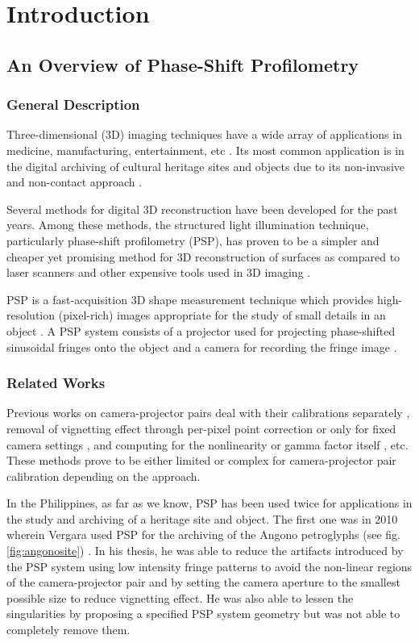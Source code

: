 \chapter{Introduction}
\section{An Overview of Phase-Shift Profilometry}
\subsection{General Description}

Three-dimensional (3D) imaging techniques have a wide array of applications in medicine, manufacturing, entertainment, etc \cite{Guo2009}. 
Its most common application is in the digital archiving of cultural heritage sites and objects due to its non-invasive and non-contact approach \cite{Simon2013}. 

Several methods for digital 3D reconstruction have been developed for the past years. Among these methods, the structured light illumination technique, particularly phase-shift profilometry (PSP), has proven to be a simpler and cheaper yet promising method for 3D reconstruction of surfaces as compared to laser scanners and other expensive tools used in 3D imaging \cite{Zhang2006, Moreno}. 

PSP is a fast-acquisition 3D shape measurement technique which provides high-resolution (pixel-rich) images appropriate for the study of small details in an object \cite{Stoykova2008}. 
A PSP system consists of a projector used for projecting phase-shifted sinusoidal fringes onto the object and a camera for recording the fringe image \cite{Chen2012}.

\subsection{Related Works}

Previous works on camera-projector pairs deal with their calibrations separately \cite{Fernandez}, removal of vignetting effect through per-pixel point correction \cite{Yu2004} or only for fixed camera settings \cite{Goldman2010}, and computing for the nonlinearity or gamma factor itself \cite{Wang2014}, etc. 
These methods prove to be either limited or complex for camera-projector pair calibration depending on the approach.

In the Philippines, as far as we know, PSP has been used twice for applications in the study and archiving of a heritage site and object. 
The first one was in 2010 wherein Vergara used PSP for the archiving of the Angono petroglyphs (see fig. \ref{fig:angonosite}) \cite{Vergara2010}. 
In his thesis, he was able to reduce the artifacts introduced by the PSP system using low intensity fringe patterns to avoid the non-linear regions of the camera-projector pair and by setting the camera aperture to the smallest possible size to reduce vignetting effect. 
He was also able to lessen the singularities by proposing a specified PSP system geometry but was not able to completely remove them. 

